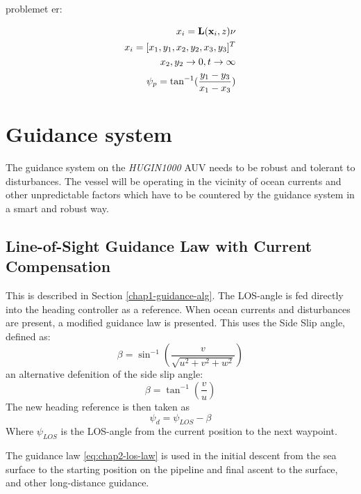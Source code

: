 		problemet er:
		
		\begin {align}
			x_i = \mathbf{L}(\mathbf{x}_i, z) \nu \\
			x_i = [x_1, y_1, x_2, y_2, x_3, y_3]^T \\
			x_2, y_2 \rightarrow 0 , t \rightarrow \infty \\
			\psi_p = \tan^{-1} (\frac{y_1 - y_3}{x_1 - x_3}) \\
		\end {align}
			
		
		
		
\section{Guidance system}
	The guidance system on the \textit{HUGIN1000} AUV needs to be robust and tolerant to disturbances. The vessel will be operating in the vicinity of ocean currents and other unpredictable factors which have to be countered by the guidance system in a smart and robust way.
	
	
	
	\subsection{Line-of-Sight Guidance Law with Current Compensation}
		This is described in Section \ref{chap1-guidance-alg}. The LOS-angle is fed directly into the heading controller as a reference. When ocean currents and disturbances are present, a modified guidance law is presented. This uses the Side Slip angle, defined as:
		\begin{equation}
			\label{eq:chap2-sideslip}
			\beta = \sin^{-1} ( \frac{v}{\sqrt{u^2 + v^2 + w^2}})
		\end{equation}
		an alternative defenition of the side slip angle:
		\begin{equation*}
			\beta = \tan^{-1} (\frac{v}{u})
		\end{equation*}
		The new heading reference is then taken as
		\begin{equation}
			\label{eq:chap2-los-law}
			\psi_d = \psi_{LOS} - \beta
		\end{equation}
		Where $\psi_{LOS}$ is the LOS-angle from the current position to the next waypoint.
		
		The guidance law \eqref{eq:chap2-los-law} is used in the initial descent from the sea surface to the starting position on the pipeline and final ascent to the surface, and other long-distance guidance.
		
